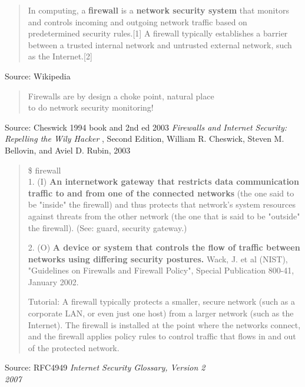 \documentclass[Screen16to9,17pt]{foils}
\begin{document}

\begin{quote}
In computing, a {\bf firewall} is a {\bf network security system} that monitors and controls incoming and outgoing network traffic based on predetermined security rules.[1] A firewall typically establishes a barrier between a trusted internal network and untrusted external network, such as the Internet.[2]
\end{quote}
Source: Wikipedia 

\begin{quote}
Firewalls are by design a choke point, natural place \\
to do network security monitoring!
\end{quote}

Source: Cheswick 1994 book and 2nd ed 2003
\emph{Firewalls and Internet Security: Repelling the Wily Hacker} , Second Edition, William R. Cheswick, Steven M. Bellovin, and Aviel D. Rubin, 2003





\begin{quote}\small
\$ firewall\\

1. (I) {\bf An internetwork gateway that restricts data communication traffic to and from one of the connected networks} (the one said to be "inside" the firewall) and thus protects that network's system resources against threats from the other network (the one that is said to be "outside" the firewall). (See: guard, security gateway.)

2. (O) {\bf A device or system that controls the flow of traffic between networks using differing security postures.} Wack, J. et al (NIST), "Guidelines on Firewalls and Firewall Policy", Special Publication 800-41, January 2002.

Tutorial: A firewall typically protects a smaller, secure network (such as a corporate LAN, or even just one host) from a larger network (such as the Internet). The firewall is installed at the point where the networks connect, and the firewall applies policy rules to control traffic that flows in and out of the protected network.
\end{quote}
Source: RFC4949 \emph{Internet Security Glossary, Version 2\\
 2007}
\end{document}
